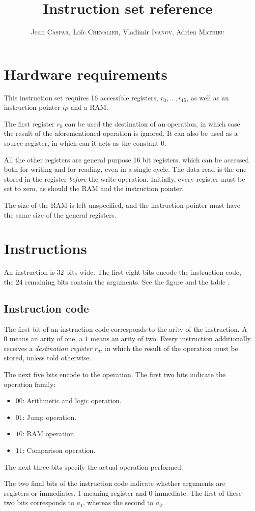 \documentclass{scrartcl}
\title{Instruction set reference}
\author{%
  Jean \textsc{Caspar},
  Loïc \textsc{Chevalier},
  Vladimir \textsc{Ivanov},
  Adrien \textsc{Mathieu}
}
\date{}
\begin{document}
\maketitle{}
\section*{Hardware requirements}
This instruction set requires 16 accessible registers, \(r_0,\ldots,r_{15}\), as
well as an instruction pointer \(ip\) and a RAM.\par
The first register \(r_0\) can be used the destination of an operation, in which
case the result of the aforementioned operation is ignored. It can also be used
as a source register, in which can it acts as the constant \(0\).\par
All the other registers are general purpose 16 bit registers, which can be
accessed both for writing and for reading, even in a single cycle.
The data read is the one stored in the register \textit{before} the write
operation. Initially, every register must be set to zero, as should the
RAM and the instruction pointer.\par
The size of the RAM is left unspecified, and the instruction pointer must have
the same size of the general registers.

\section*{Instructions}
An instruction is 32 bits wide. The first eight bits encode the
instruction code, the 24 remaining bits contain the arguments. See
the figure  and the table .
\subsection*{Instruction code}
The first bit of an instruction code corresponds to the arity of the instruction.
A $0$ means an arity of one, a $1$ means an arity of two. Every instruction
additionally receives a \emph{destination register} $r_d$, in which the result of
the operation must be stored, unless told otherwise.\par
The next five bits encode to the operation. The first two bits indicate the
operation family:
\begin{itemize}
\item $00$: Arithmetic and logic operation.
\item $01$: Jump operation.
\item $10$: RAM operation
\item $11$: Comparison operation.
\end{itemize}
The next three bits specify the actual operation performed.\par
The two final bits of the instruction code indicate whether arguments are
registers or immediates, $1$ meaning register and $0$ immediate. The first of
these two bits corresponds to $a_1$, whereas the second to $a_2$.
\end{document}
